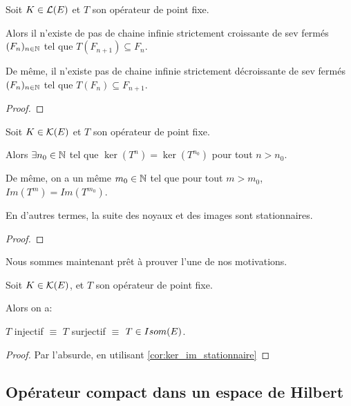 \begin{proposition}
	Soit $K \in \mathcal{L}(E)$ et $T$ son opérateur de point fixe.
	
	Alors il n'existe de pas de chaine infinie strictement croissante de sev
	fermés $(F_{n})_{n \in \mathbb{N}}$ tel que $T(F_{n + 1}) \subseteq
	F_{n}$.

	De même, il n'existe pas de chaine infinie strictement décroissante de
	sev fermés $(F_{n})_{n \in \mathbb{N}}$ tel que $T(F_{n}) \subseteq F_{n +
	1}$.
\end{proposition}

\begin{proof}
\end{proof}

\begin{corollary}
	\label{cor:ker_im_stationnaire}
	Soit $K \in \mathcal{K}(E)$ et $T$ son opérateur de point fixe.

	Alors $\exists n_{0} \in \mathbb{N}$ tel que $\ker(T^{n}) = \ker(T^{n_{0}})$
	pour tout $n > n_{0}$.

	De même, on a un même $m_{0} \in \mathbb{N}$ tel que pour tout $m > m_{0}$,
	$Im(T^{m}) = Im(T^{m_{0}})$.

	En d'autres termes, la suite des noyaux et des images sont stationnaires.
\end{corollary}

\begin{proof}
	
\end{proof}

Nous sommes maintenant prêt à prouver l'une de nos motivations.

\begin{proposition}
	\label{prop:equiv_inj_surj_bij}
	Soit $K \in \mathcal{K}(E)$, et $T$ son opérateur de point fixe.

	Alors on a:

	$T$ injectif $\equiv$ $T$ surjectif $\equiv$ $T \in Isom(E)$.
\end{proposition}

\begin{proof}
	Par l'absurde, en utilisant \ref{cor:ker_im_stationnaire} 
\end{proof}

\subsection{Opérateur compact dans un espace de Hilbert}

